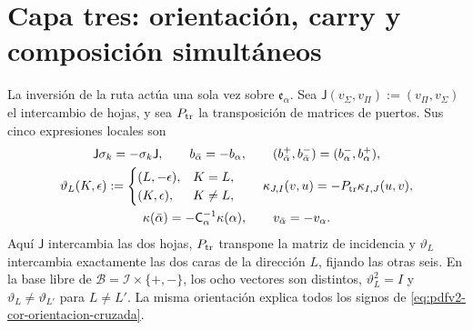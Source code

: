 \section{Capa tres: orientación, carry y composición simultáneos}

La inversión de la ruta actúa una sola vez sobre
\(\mathfrak e_\alpha\). Sea
\(\mathsf J(v_\Sigma,v_\Pi):=(v_\Pi,v_\Sigma)\) el intercambio de hojas,
y sea \(P_{\rm tr}\) la transposición de matrices de puertos. Sus cinco
expresiones locales son
\begin{equation}
\label{eq:pdfv2-cor-orientacion-cruzada}
 \begin{gathered}
 \mathsf J\sigma_k=-\sigma_k\mathsf J,
 \qquad b_{\bar\alpha}=-b_\alpha,
 \qquad (b_{\bar\alpha}^+,b_{\bar\alpha}^-)
       =(b_\alpha^-,b_\alpha^+),\\
 \vartheta_L(K,\epsilon):=
 \begin{cases}
  (L,-\epsilon),&K=L,\\
  (K,\epsilon),&K\neq L,
 \end{cases}
 \qquad
 \kappa_{J,I}(v,u)=-P_{\rm tr}\kappa_{I,J}(u,v),\\
 \kappa(\bar\alpha)
 =-\mathsf C_\alpha^{-1}\kappa(\alpha),
 \qquad v_{\bar\alpha}=-v_\alpha.
 \end{gathered}
\end{equation}
Aquí \(\mathsf J\) intercambia las dos hojas, \(P_{\rm tr}\) transpone la matriz de
incidencia y \(\vartheta_L\) intercambia exactamente las dos caras de la
dirección \(L\), fijando las otras seis. En la base libre de
\(\mathscr B=\mathscr I\times\{+,-\}\), los ocho vectores son distintos,
\(\vartheta_L^2=I\) y
\(\vartheta_L\neq\vartheta_{L'}\) para \(L\neq L'\). La misma orientación
explica todos los signos de
\eqref{eq:pdfv2-cor-orientacion-cruzada}.

